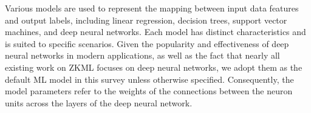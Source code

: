 \documentclass[journal]{IEEEtran}
\begin{document}
Various models are used to represent the mapping between input data features and output labels, including linear regression, decision trees, support vector machines, and deep neural networks. Each model has distinct characteristics and is suited to specific scenarios. Given the popularity and effectiveness of deep neural networks in modern applications, as well as the fact that nearly all existing work on ZKML focuses on deep neural networks, we adopt them as the default ML model in this survey unless otherwise specified. Consequently, the model parameters refer to the weights of the connections between the neuron units across the layers of the deep neural network.





\end{document}
